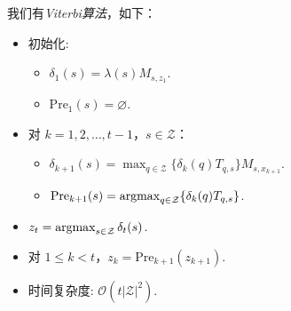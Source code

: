 \newcommand{\pre}{\mathrm{Pre}}
我们有\emph{Viterbi算法}，如下：
\begin{itemize}
    \item 初始化:
    \begin{itemize}
        \item $\delta_1(s) = \lambda(s)M_{s,z_1}$.
        \item $\pre_1(s) = \varnothing$.
    \end{itemize}
    \item 对 $k=1, 2, \dots, t-1$，$s \in \mathcal Z$：
    \begin{itemize}
        \item $\delta_{k+1}(s) = \max_{q\in \mathcal Z}\{\delta_k(q)T_{q,s}\}M_{s,x_{k+1}}$.
        \item $\pre_{k+1}(s) = \argmax_{q\in \mathcal Z}\{\delta_k(q)T_{q,s}\}$.
    \end{itemize}
    \item $z_t = \operatorname*{argmax}_{s \in \mathcal Z}\delta_{t}(s)$.
    \item 对 $1 \le k < t$，$z_k = \pre_{k+1}(z_{k+1})$.
    \item 时间复杂度: $\mathcal O(t|\mathcal Z|^2)$.
\end{itemize}

\endgroup